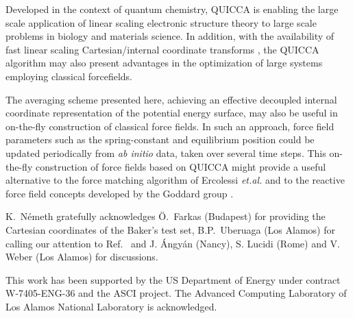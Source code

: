 \documentclass[prl,aps,preprint,showpacs,superbib]{revtex4}
\begin{document}
Developed in the context of quantum chemistry, QUICCA is enabling the large scale application of  
linear scaling electronic structure theory to large scale problems in biology and materials science. 
In addition, with the availability of fast linear scaling Cartesian/internal coordinate transforms 
\cite{nemeth_coordtrf1}, the QUICCA algorithm may also present advantages in the optimization of 
large systems employing classical forcefields.

The averaging scheme presented here, achieving an effective decoupled internal coordinate representation
of the potential energy surface, may also be useful in on-the-fly construction of classical force fields.
In such an approach, force field parameters such as the spring-constant and equilibrium position 
could be updated periodically from {\em ab initio} data, taken over several time steps. 
This on-the-fly construction of force fields based on QUICCA might provide a useful  alternative to 
the force matching algorithm of Ercolessi {\it et.al.} \cite{force-matching} and to the reactive 
force field concepts developed by the Goddard group \cite{reaxff1,reaxff2}.

\begin{acknowledgments}
K.~N{\'e}meth gratefully acknowledges {\"{O}}.~Farkas (Budapest) for providing the 
Cartesian coordinates of the Baker's test set,  B.P.~Uberuaga (Los Alamos) for 
calling our attention to Ref.~\cite{force-matching} and  J. {\'A}ngy{\'a}n
(Nancy), S. Lucidi (Rome) and V. Weber (Los Alamos) for discussions.

This work has been supported by the US Department of Energy 
under contract W-7405-ENG-36 and the ASCI project.  
The Advanced Computing Laboratory of Los 
Alamos National Laboratory is acknowledged.
\end{acknowledgments}


\end{document}
